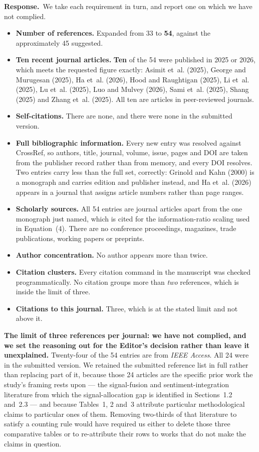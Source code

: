 \documentclass[11pt,a4paper]{article}
\newcommand{\resp}{\par\medskip\noindent\textbf{Response.}\ }
\begin{document}
\resp We take each requirement in turn, and report one on which we have not complied.

\begin{itemize}
\item \textbf{Number of references.} Expanded from 33 to \textbf{54}, against the
approximately 45 suggested.
\item \textbf{Ten recent journal articles.} \textbf{Ten} of the 54 were published in 2025
or 2026, which meets the requested figure exactly: Asimit et~al. (2025), George and
Murugesan (2025), Ha et~al. (2026), Hood and Raughtigan (2025), Li et~al. (2025), Lu
et~al. (2025), Luo and Mulvey (2026), Sami et~al. (2025), Shang (2025) and Zhang et~al.
(2025). All ten are articles in peer-reviewed journals.
\item \textbf{Self-citations.} There are none, and there were none in the submitted
version.
\item \textbf{Full bibliographic information.} Every new entry was resolved against
CrossRef, so authors, title, journal, volume, issue, pages and DOI are taken from the
publisher record rather than from memory, and every DOI resolves. Two entries carry less
than the full set, correctly: Grinold and Kahn (2000) is a monograph and carries edition
and publisher instead, and Ha et~al. (2026) appears in a journal that assigns article
numbers rather than page ranges.
\item \textbf{Scholarly sources.} All 54 entries are journal articles apart from the one
monograph just named, which is cited for the information-ratio scaling used in
Equation~(4). There are no conference proceedings, magazines, trade publications, working
papers or preprints.
\item \textbf{Author concentration.} No author appears more than twice.
\item \textbf{Citation clusters.} Every citation command in the manuscript was checked
programmatically. No citation groups more than \emph{two} references, which is inside the
limit of three.
\item \textbf{Citations to this journal.} Three, which is at the stated limit and not
above it.
\end{itemize}

\textbf{The limit of three references per journal: we have not complied, and we set the
reasoning out for the Editor's decision rather than leave it unexplained.} Twenty-four of
the 54 entries are from \emph{IEEE Access}. All 24 were in the submitted version. We
retained the submitted reference list in full rather than replacing part of it, because
those 24 articles are the specific prior work the study's framing rests upon --- the
signal-fusion and sentiment-integration literature from which the signal-allocation gap is
identified in Sections~1.2 and~2.3 --- and because Tables~1, 2 and~3 attribute particular
methodological claims to particular ones of them. Removing two-thirds of that literature
to satisfy a counting rule would have required us either to delete those three comparative
tables or to re-attribute their rows to works that do not make the claims in question.
\end{document}
